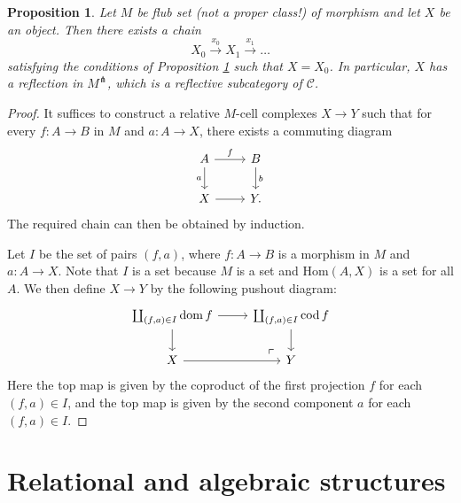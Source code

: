 \documentclass[a4paper]{article}
\newtheorem{proposition}[theorem]{Proposition}
\theoremstyle{remark}
\theoremstyle{definition}
\begin{document}
\begin{proposition}
  \label{prop:orth-refl-constr-exist}
  Let $M$ be flub set (not a proper class!) of morphism and let $X$ be an object.
  Then there exists a chain
  \begin{equation}
    X_0 \xrightarrow{x_0} X_1 \xrightarrow{x_1} \dots
  \end{equation}
  satisfying the conditions of Proposition \ref{prop:orth-refl-constr-exist} such that $X = X_0$.
  In particular, $X$ has a reflection in $M^\pitchfork$, which is a reflective subcategory of $\mathcal{C}$.
\end{proposition}
\begin{proof}
  It suffices to construct a relative $M$-cell complexes $X \rightarrow Y$ such that for every $f : A \rightarrow B$ in $M$ and $a : A \rightarrow X$, there exists a commuting diagram
  \begin{equation}
    \begin{tikzcd}
      A \arrow[r, "f"] \arrow[d, "a"'] & B \arrow[d, "b"] \\
      X \arrow[r] & Y.
    \end{tikzcd}
  \end{equation}
  The required chain can then be obtained by induction.

  Let $I$ be the set of pairs $(f, a)$, where $f : A \rightarrow B$ is a morphism in $M$ and $a : A \rightarrow X$.
  Note that $I$ is a set because $M$ is a set and $\mathrm{Hom}(A, X)$ is a set for all $A$.
  We then define $X \rightarrow Y$ by the following pushout diagram:
  \begin{equation}
    \begin{tikzcd}
      \coprod_{(f, a) \in I} \operatorname{dom} f \arrow[r] \arrow[d] \arrow[dr, phantom, very near end, "\ulcorner"] & \coprod_{(f, a) \in I} \operatorname{cod} f \arrow[d] \\
      X \arrow[r] & Y
    \end{tikzcd}
  \end{equation}
  Here the top map is given by the coproduct of the first projection $f$ for each $(f, a) \in I$, and the top map is given by the second component $a$ for each $(f, a) \in I$.
\end{proof}

\section{Relational and algebraic structures}
\label{sec:relational-algebraic-structures}
\end{document}
